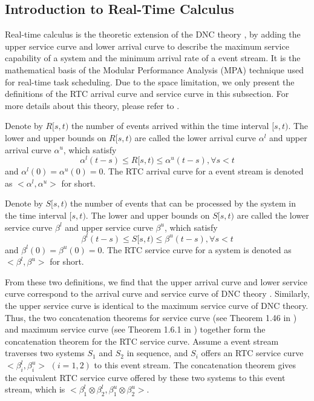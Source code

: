 \documentclass[preprint]{elsarticle}
\begin{document}
\subsection{Introduction to Real-Time Calculus}\label{intrortc}
Real-time calculus \cite{1253607} is the theoretic extension of the DNC theory \cite{Boudec2001Network}, by adding the upper service curve and lower arrival curve to describe the maximum service capability of a system and the minimum arrival rate of a event stream. It is the mathematical basis of the Modular Performance Analysis (MPA) \cite{Wandeler2006System} technique used for real-time task scheduling. Due to the space limitation, we only present the definitions of the RTC arrival curve and service curve in this subsection. For more details about this theory, please refer to \cite{1253607}.
\begin{rmk}\label{acu}
Denote by $R[s,t)$ the number of events arrived within the time interval $[s,t)$. The lower and upper bounds on $R[s,t)$ are called the lower arrival curve $\alpha^l$ and upper arrival curve $\alpha^u$, which satisfy
$$\alpha^l(t-s)\leq R[s,t)\leq \alpha^u(t-s),\forall s<t$$
and $\alpha^l(0)=\alpha^u(0)=0$. The RTC arrival curve for a event stream is denoted as $<\alpha^l,\alpha^u>$ for short.
\end{rmk}

\begin{rmk}
Denote by $S[s,t)$ the number of events that can be processed by the system in the time interval $[s,t)$. The lower and upper bounds on $S[s,t)$ are called the lower service curve $\beta^l$ and upper service curve $\beta^u$, which satisfy
$$\beta^l(t-s)\leq S[s,t)\leq \beta^u(t-s),\forall s<t$$
and $\beta^l(0)=\beta^u(0)=0$. The RTC service curve for a system is denoted as $<\beta^l,\beta^u>$ for short.
\end{rmk}

From these two definitions, we find that the upper arrival curve and lower service curve correspond to the arrival curve and service curve of DNC theory \cite{Boudec2001Network}. Similarly, the upper service curve is identical to the maximum service curve of DNC theory. Thus, the two concatenation theorems for service curve (see Theorem 1.46 in \cite{Boudec2001Network}) and maximum service curve (see Theorem 1.6.1 in \cite{Boudec2001Network}) together form the concatenation theorem for the RTC service curve. Assume a event stream traverses two systems $S_1$ and $S_2$ in sequence, and $S_i$ offers an RTC service curve $<\beta^l_i,\beta^u_i>$ $(i=1,2)$ to this event stream. The concatenation theorem gives the equivalent RTC service curve offered by these two systems to this event stream, which is $<\beta^l_1\otimes\beta^l_2,\beta^u_1\otimes\beta^u_2>$.
\end{document}
